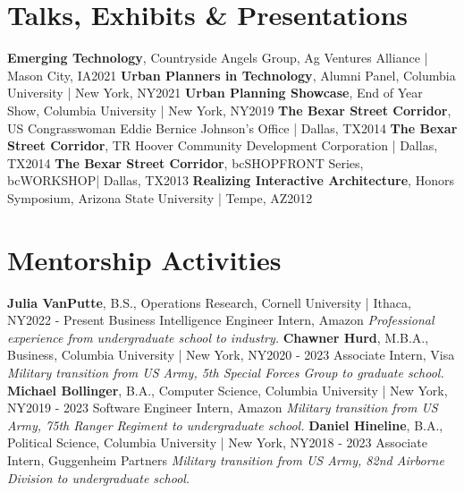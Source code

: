 \documentclass{article}
\begin{document}
    \section*{Talks, Exhibits \& Presentations}
        \textbf{Emerging Technology}, Countryside Angels Group, Ag Ventures Alliance | Mason City, IA\hfill{2021}\newline
        \textbf{Urban Planners in Technology}, Alumni Panel, Columbia University | New York, NY\hfill{2021}\newline
        \textbf{Urban Planning Showcase}, End of Year Show, Columbia University | New York, NY\hfill{2019}\newline
        \textbf{The Bexar Street Corridor}, US Congrasswoman Eddie Bernice Johnson's Office | Dallas, TX\hfill{2014}\newline
        \textbf{The Bexar Street Corridor}, TR Hoover Community Development Corporation | Dallas, TX\hfill{2014}\newline
        \textbf{The Bexar Street Corridor}, bcSHOPFRONT Series, bcWORKSHOP| Dallas, TX\hfill{2013}\newline
        \textbf{Realizing Interactive Architecture}, Honors Symposium, Arizona State University | Tempe, AZ\hfill{2012}
    \section*{Mentorship Activities}
        \textbf{Julia VanPutte}, B.S., Operations Research, Cornell University | Ithaca, NY\hfill{2022 - Present}\newline
        Business Intelligence Engineer Intern, Amazon\newline
        \textit{Professional experience from undergraduate school to industry.}\newline\newline
        \textbf{Chawner Hurd}, M.B.A., Business, Columbia University | New York, NY\hfill{2020 - 2023}\newline
        Associate Intern, Visa\newline
        \textit{Military transition from US Army, 5th Special Forces Group to graduate school.}\newline\newline
        \textbf{Michael Bollinger}, B.A., Computer Science, Columbia University | New York, NY\hfill{2019 - 2023}\newline
        Software Engineer Intern, Amazon\newline
        \textit{Military transition from US Army, 75th Ranger Regiment to undergraduate school.}\newline\newline
        \textbf{Daniel Hineline}, B.A., Political Science, Columbia University | New York, NY\hfill{2018 - 2023}\newline
        Associate Intern, Guggenheim Partners\newline
        \textit{Military transition from US Army, 82nd Airborne Division to undergraduate school.}
\end{document}
